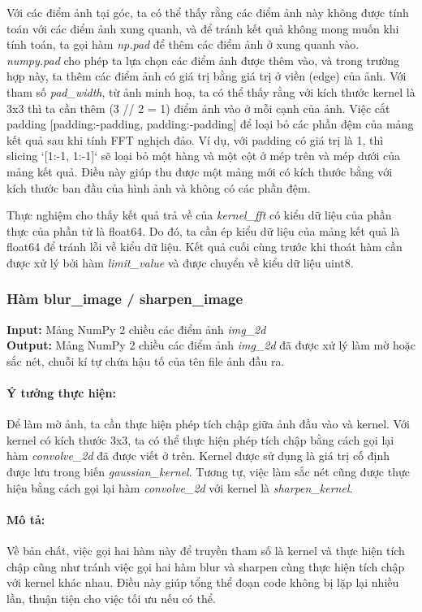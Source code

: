 \documentclass[]{article}
\begin{document}
Với các điểm ảnh tại góc, ta có thể thấy rằng các điểm ảnh này không được tính toán với các điểm ảnh xung quanh, và để tránh kết quả không mong muốn khi tính toán, ta gọi hàm \textit{np.pad} để thêm các điểm ảnh ở xung quanh vào. \textit{numpy.pad} cho phép ta lựa chọn các điểm ảnh được thêm vào, và trong trường hợp này, ta thêm các điểm ảnh có giá trị bằng giá trị ở viền (edge) của ảnh. Với tham số \textit{pad\_width}, từ ảnh minh hoạ, ta có thể thấy rằng với kích thước kernel là 3x3 thì ta cần thêm (3 // 2 = 1) điểm ảnh vào ở mỗi cạnh của ảnh. Việc cắt padding [padding:-padding, padding:-padding] để loại bỏ các phần đệm của mảng kết quả sau khi tính FFT nghịch đảo. Ví dụ, với padding có giá trị là 1, thì slicing `[1:-1, 1:-1]` sẽ loại bỏ một hàng và một cột ở mép trên và mép dưới của mảng kết quả. Điều này giúp thu được một mảng mới có kích thước bằng với kích thước ban đầu của hình ảnh và không có các phần đệm.\par

Thực nghiệm cho thấy kết quả trả về của \textit{kernel\_fft} có kiểu dữ liệu của phần thực của phần tử là float64. Do đó, ta cần ép kiểu dữ liệu của mảng kết quả là float64 để tránh lỗi về kiểu dữ liệu. Kết quả cuối cùng trước khi thoát hàm cần được xử lý bởi hàm \textit{limit\_value} và được chuyển về kiểu dữ liệu uint8. \par


\subsubsection{Hàm blur\_image / sharpen\_image}
\textbf{Input:} Mảng NumPy 2 chiều các điểm ảnh \textit{img\_2d} \\
\textbf{Output:} Mảng NumPy 2 chiều các điểm ảnh \textit{img\_2d} đã được xử lý làm mờ hoặc sắc nét, chuỗi kí tự chứa hậu tố của tên file ảnh đầu ra. \\
\paragraph{Ý tưởng thực hiện:} Để làm mờ ảnh, ta cần thực hiện phép tích chập giữa ảnh đầu vào và kernel. Với kernel có kích thước 3x3, ta có thể thực hiện phép tích chập bằng cách gọi lại hàm \textit{convolve\_2d} đã được viết ở trên. Kernel được sử dụng là giá trị cố định được lưu trong biến \textit{gaussian\_kernel}. Tương tự, việc làm sắc nét cũng được thực hiện bằng cách gọi lại hàm \textit{convolve\_2d} với kernel là \textit{sharpen\_kernel}. \par
\paragraph{Mô tả:}
Về bản chất, việc gọi hai hàm này để truyền tham số là kernel và thực hiện tích chập cũng như tránh việc gọi hai hàm blur và sharpen cùng thực hiện tích chập với kernel khác nhau. Điều này giúp tổng thể đoạn code không bị lặp lại nhiều lần, thuận tiện cho việc tối ưu nếu có thể. \par
\end{document}

